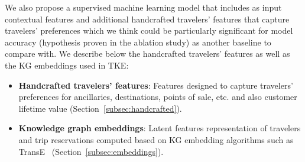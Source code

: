 \documentclass[11pt,dvipdfm]{article}
\begin{document}
We also propose a supervised machine learning model that includes as input contextual features and additional handcrafted travelers' features that capture travelers' preferences which we think could be particularly significant for model accuracy (hypothesis proven in the ablation study) as another baseline to compare with. We describe below the handcrafted travelers' features as well as the KG embeddings used in TKE:
\begin{itemize}
    \item \textbf{Handcrafted travelers' features}: Features designed to capture travelers' preferences for ancillaries, destinations, points of sale, etc. and also customer lifetime value (Section~\ref{subsec:handcrafted}). 
    \item \textbf{Knowledge graph embeddings}: Latent features representation of travelers and trip reservations computed based on KG embedding algorithms such as TransE~\cite{bordes13} (Section~\ref{subsec:embeddings}). 
\end{itemize}
\end{document}
